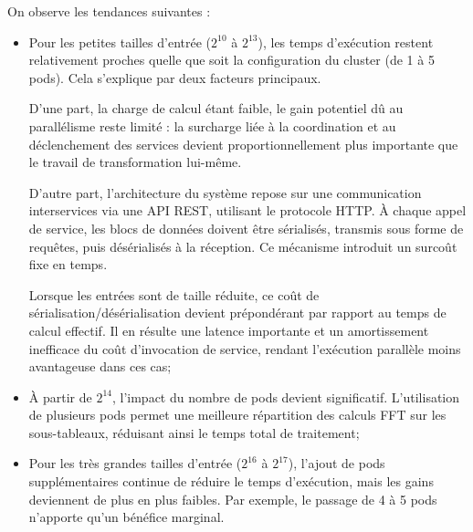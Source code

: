On observe les tendances suivantes :
\begin{itemize}
    \item Pour les petites tailles d’entrée ($2^{10}$ à $2^{13}$), les temps d’exécution restent relativement proches quelle que soit la configuration du cluster (de 1 à 5 pods). Cela s’explique par deux facteurs principaux.
    
    D’une part, la charge de calcul étant faible, le gain potentiel dû au parallélisme reste limité : la surcharge liée à la coordination et au déclenchement des services devient proportionnellement plus importante que le travail de transformation lui-même.
    
    D’autre part, l’architecture du système repose sur une communication interservices via une API REST, utilisant le protocole HTTP. À chaque appel de service, les blocs de données doivent être sérialisés, transmis sous forme de requêtes, puis désérialisés à la réception. Ce mécanisme introduit un surcoût fixe en temps.%
    
    Lorsque les entrées sont de taille réduite, ce coût de sérialisation/désérialisation devient prépondérant par rapport au temps de calcul effectif. Il en résulte une latence importante et un amortissement inefficace du coût d’invocation de service, rendant l’exécution parallèle moins avantageuse dans ces cas;
    
  
  \item À partir de $2^{14}$, l’impact du nombre de pods devient significatif. L’utilisation de plusieurs pods permet une meilleure répartition des calculs FFT sur les sous-tableaux, réduisant ainsi le temps total de traitement;


  \item Pour les très grandes tailles d’entrée ($2^{16}$ à $2^{17}$), l’ajout de pods supplémentaires continue de réduire le temps d’exécution, mais les gains deviennent de plus en plus faibles. Par exemple, le passage de 4 à 5 pods n’apporte qu’un bénéfice marginal.


\end{itemize}
